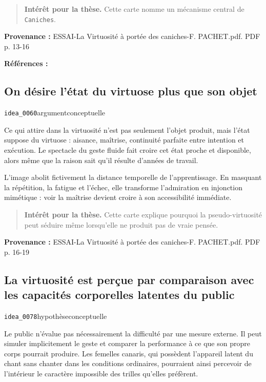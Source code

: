 \documentclass[10pt,a4paper]{article}
\begin{document}
\begin{quote}
\textbf{Intérêt pour la thèse.} Cette carte nomme un mécanisme central de \texttt{Caniches}.
\end{quote}
{\footnotesize\color{metadata}\textbf{Provenance :} ESSAI-La Virtuosité à portée des caniches-F. PACHET.pdf. PDF p. 13-16\par}
{\footnotesize\color{metadata}\textbf{Références :} \parencite{pachet2027virtuosite}\par}

\subsection{On désire l'état du virtuose plus que son objet}
{\small\color{metadata} \texttt{idea\_0060}\quad\textbullet\quad argument\quad\textbullet\quad conceptuelle\par}

Ce qui attire dans la virtuosité n'est pas seulement l'objet produit, mais l'état suppose du virtuose : aisance, maîtrise, continuité parfaite entre intention et exécution. Le spectacle du geste fluide fait croire cet état proche et disponible, alors même que la raison sait qu'il résulte d'années de travail.

L'image abolit fictivement la distance temporelle de l'apprentissage. En masquant la répétition, la fatigue et l'échec, elle transforme l'admiration en injonction mimétique : voir la maîtrise devient croire à son accessibilité immédiate.

\begin{quote}
\textbf{Intérêt pour la thèse.} Cette carte explique pourquoi la pseudo-virtuosité peut séduire même lorsqu'elle ne produit pas de vraie pensée.
\end{quote}
{\footnotesize\color{metadata}\textbf{Provenance :} ESSAI-La Virtuosité à portée des caniches-F. PACHET.pdf. PDF p. 16-19\par}

\subsection{La virtuosité est perçue par comparaison avec les capacités corporelles latentes du public}
{\small\color{metadata} \texttt{idea\_0078}\quad\textbullet\quad hypothèse\quad\textbullet\quad conceptuelle\par}

Le public n'évalue pas nécessairement la difficulté par une mesure externe. Il peut simuler implicitement le geste et comparer la performance à ce que son propre corps pourrait produire. Les femelles canaris, qui possèdent l'appareil latent du chant sans chanter dans les conditions ordinaires, pourraient ainsi percevoir de l'intérieur le caractère impossible des trilles qu'elles préfèrent.
\end{document}
